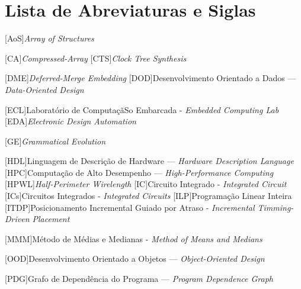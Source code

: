 \chapter * {Lista de Abreviaturas e Siglas}
\thispagestyle{empty}
\label{acro}


\begin{acronym}
\setlength{\parskip}{0ex}
\setlength{\itemsep}{1ex}


\renewcommand{\baselinestretch}{0.25}%
\large\normalsize%



[AoS]{\textit{Array of Structures}}

[CA]{\textit{Compressed-Array}}
[CTS]{\textit{Clock Tree Synthesis}}

[DME]{\textit{Deferred-Merge Embedding}}
[DOD]{Desenvolvimento Orientado a Dados --- \textit{Data-Oriented Design}}

[ECL]{Laboratório de ComputaçãSo Embarcada - \textit{Embedded Computing Lab}}
[EDA]{\textit{Electronic Design Automation}}


[GE]{\textit{Grammatical Evolution}}

[HDL]{Linguagem de Descrição de Hardware --- \textit{Hardware Description Language}}
[HPC]{Computação de Alto Desempenho --- \textit{High-Performance Computing}}
[HPWL]{\textit{Half-Perimeter Wirelength}}
[IC]{Circuito Integrado - \textit{Integrated Circuit}}
[ICs]{Circuitos Integrados - \textit{Integrated Circuits}}
[ILP]{Programação Linear Inteira}
[ITDP]{Posicionamento Incremental Guiado por Atraso - \textit{Incremental Timming-Driven Placement}}



[MMM]{Método de Médias e Medianas - \textit{Method of Means and Medians}}


[OOD]{Desenvolvimento Orientado a Objetos --- \textit{Object-Oriented Design}}

[PDG]{Grafo de Dependência do Programa --- \textit{Program Dependence Graph}}


\end{acronym}
